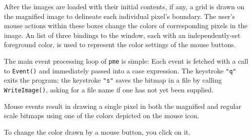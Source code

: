 After the images are loaded with their initial contents, if any, a
grid is drawn on the magnified image to delineate each individual
pixel's boundary. The user's mouse actions within these boxes change
the colors of corresponding pixels in the image. An list of three
bindings to the window, each with an independently-set foreground
color, is used to represent the color settings of the mouse buttons.


The main event processing loop of \texttt{pme} is simple: Each event
is fetched with a call to \texttt{Event()} and immediately passed into
a case expression. The keystroke \texttt{"q"} exits the program; the
keystroke \texttt{"s"} saves the bitmap in a file by calling
\texttt{WriteImage()}, asking for a file name if one has not yet been
supplied.


Mouse events result in drawing a single pixel in both the magnified and
regular scale bitmaps using one of the colors depicted on the mouse icon. 


To change the color drawn by a mouse button, you click on it.


